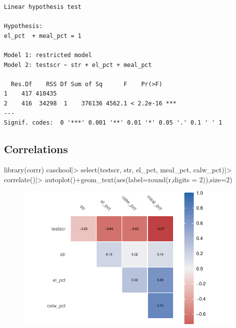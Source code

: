 \documentclass[
  letterpaper,
  DIV=11,
  numbers=noendperiod]{scrartcl}
\newenvironment{Shaded}{\begin{snugshade}}{\end{snugshade}}
\newcommand{\AttributeTok}[1]{\textcolor[rgb]{0.56,0.74,0.73}{#1}}
\newcommand{\DecValTok}[1]{\textcolor[rgb]{0.71,0.56,0.68}{#1}}
\newcommand{\FunctionTok}[1]{\textcolor[rgb]{0.53,0.75,0.82}{#1}}
\newcommand{\NormalTok}[1]{\textcolor[rgb]{0.85,0.87,0.91}{#1}}
\newcommand{\SpecialCharTok}[1]{\textcolor[rgb]{0.92,0.80,0.55}{#1}}
\begin{document}
\begin{verbatim}
Linear hypothesis test

Hypothesis:
el_pct  + meal_pct = 1

Model 1: restricted model
Model 2: testscr ~ str + el_pct + meal_pct

  Res.Df    RSS Df Sum of Sq      F    Pr(>F)    
1    417 410435                                  
2    416  34298  1    376136 4562.1 < 2.2e-16 ***
---
Signif. codes:  0 '***' 0.001 '**' 0.01 '*' 0.05 '.' 0.1 ' ' 1
\end{verbatim}

\hypertarget{correlations}{%
\subsection{Correlations}\label{correlations}}

\begin{Shaded}
\begin{Highlighting}[]
\FunctionTok{library}\NormalTok{(corrr)}
\NormalTok{caschool}\SpecialCharTok{|\textgreater{}} \FunctionTok{select}\NormalTok{(testscr, str, el\_pct, meal\_pct, calw\_pct)}\SpecialCharTok{|\textgreater{}}
  \FunctionTok{correlate}\NormalTok{()}\SpecialCharTok{|\textgreater{}}
  \FunctionTok{autoplot}\NormalTok{()}\SpecialCharTok{+}\FunctionTok{geom\_text}\NormalTok{(}\FunctionTok{aes}\NormalTok{(}\AttributeTok{label=}\FunctionTok{round}\NormalTok{(r,}\AttributeTok{digits =} \DecValTok{2}\NormalTok{)),}\AttributeTok{size=}\DecValTok{2}\NormalTok{)}
\end{Highlighting}
\end{Shaded}

\begin{figure}[H]

{\centering \includegraphics{Ch6_7_SW_files/figure-pdf/unnamed-chunk-8-1.pdf}

}

\end{figure}
\end{document}
